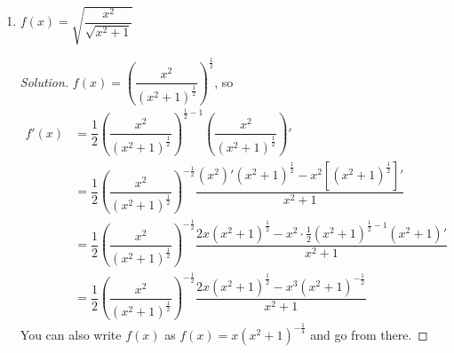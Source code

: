 \documentclass[12pt]{article}
\newenvironment{solution}{\begin{proof}[Solution]}{\end{proof}}
\begin{document}
\begin{enumerate}
\begin{enumerate}
\begin{solution}
		\end{solution}
		\item $f(x)=\sqrt{\dfrac{x^2}{\sqrt{x^2+1}}}$
		\begin{solution}
			 $f(x)=\left(\dfrac{x^2}{(x^2+1)^{\frac{1}{2}}}\right)^{\frac{1}{2}}$, so
			\begin{align*}
				f'(x)&=\dfrac{1}{2}\left(\dfrac{x^2}{(x^2+1)^{\frac{1}{2}}}\right)^{\frac{1}{2}-1}\left(\dfrac{x^2}{(x^2+1)^{\frac{1}{2}}}\right)'\\
				&=\dfrac{1}{2}\left(\dfrac{x^2}{(x^2+1)^{\frac{1}{2}}}\right)^{-\frac{1}{2}}\dfrac{(x^2)'(x^2+1)^{\frac{1}{2}}-x^2[(x^2+1)^{\frac{1}{2}}]'}{x^2+1}\\
				&=\dfrac{1}{2}\left(\dfrac{x^2}{(x^2+1)^{\frac{1}{2}}}\right)^{-\frac{1}{2}}\dfrac{2x(x^2+1)^{\frac{1}{2}}-x^2\cdot \frac{1}{2}(x^2+1)^{\frac{1}{2}-1}(x^2+1)'}{x^2+1}\\
				&=\dfrac{1}{2}\left(\dfrac{x^2}{(x^2+1)^{\frac{1}{2}}}\right)^{-\frac{1}{2}}\dfrac{2x(x^2+1)^{\frac{1}{2}}-x^3(x^2+1)^{-\frac{1}{2}}}{x^2+1}
			\end{align*}
			You can also write $f(x)$ as $f(x)=x(x^2+1)^{-\frac{1}{4}}$ and go from there.
			
		\end{solution}
	\end{enumerate}
\end{enumerate}
			
			
\end{document}
